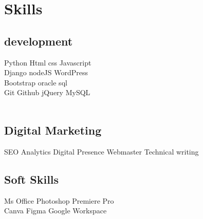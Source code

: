 \documentclass[]{deedy-resume-openfont}
\begin{document}
\begin{minipage}[t]{0.33\textwidth}
\sectionsep
\section{Skills}
\subsection{development}
Python \textbullet{} Html   \textbullet{} css \textbullet{}  Javascript  \\
 Django\textbullet{} nodeJS \textbullet{} WordPress \\ \textbullet{} Bootstrap \textbullet{} oracle sql  \\
Git \textbullet{} Github \textbullet{} jQuery \textbullet{} MySQL \\
\ \ \\
\subsection{Digital Marketing}
SEO \textbullet{} Analytics \textbullet{} Digital Presence \textbullet{} Webmaster \textbullet{} Technical writing
\sectionsep
\subsection{Soft Skills}
Ms Office \textbullet{} Photoshop \textbullet{} Premiere Pro  \\ \textbullet{} Canva\textbullet{} Figma\textbullet{} Google Workspace \\ 


%
%

\end{minipage} 
\hfill
\end{document}
